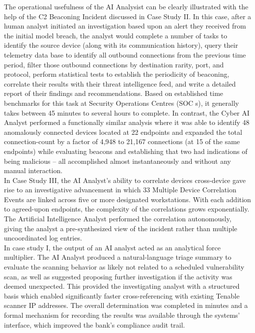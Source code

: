 \documentclass[12pt,a4paper]{report}
\begin{document}
The operational usefulness of the AI Analysist can be clearly illustrated with the help of the C2 Beaconing Incident discussed in Case Study II. In this case, after a human analyst initiated an investigation based upon an alert they received from the initial model breach, the analyst would complete a number of tasks to identify the source device (along with its communication history), query their telemetry data base to identify all outbound connections from the previous time period, filter those outbound connections by destination rarity, port, and protocol, perform statistical tests to establish the periodicity of beaconing, correlate their results with their threat intelligence feed, and write a detailed report of their findings and recommendations. Based on established time benchmarks for this task at Security Operations Centres (SOC s), it generally takes between 45 minutes to several hours to complete. In contrast, the Cyber AI Analyst performed a functionally similar analysis where it was able to identify 48 anomalously connected devices located at 22 endpoints and expanded the total connection-count by a factor of 4,948 to 21,167 connections (at 15 of the same endpoints) while evaluating beacons and establishing that two had indications of being malicious – all accomplished almost instantaneously and without any manual interaction.\\

In Case Study III, the AI Analyst’s ability to correlate devices cross-device gave rise to an investigative advancement in which 33 Multiple Device Correlation Events are linked across five or more designated workstations. With each addition to agreed-upon endpoints, the complexity of the correlations grows exponentially. The Artificial Intelligence Analyst performed the correlation autonomously, giving the analyst a pre-synthesized view of the incident rather than multiple uncoordinated log entries.\\

In case study I, the output of an AI analyst acted as an analytical force multiplier. The AI Analyst produced a natural-language triage summary to evaluate the scanning behavior as likely not related to a scheduled vulnerability scan, as well as suggested proposing further investigation if the activity was deemed unexpected. This provided the investigating analyst with a structured basis which enabled significantly faster cross-referencing with existing Tenable scanner IP addresses. The overall determination was completed in minutes and a formal mechanism for recording the results was available through the systems’ interface, which improved the bank’s compliance audit trail.
\end{document}
